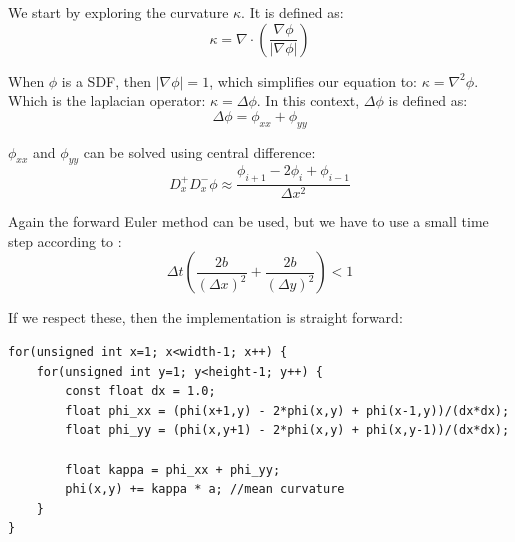 We start by exploring the curvature $\kappa$. It is defined as:
\begin{equation}
  \kappa = \nabla\cdot\left(\frac{\nabla\phi}{|\nabla\phi|}\right)
\end{equation}

When $\phi$ is a SDF, then $|\nabla\phi|=1$, which simplifies our equation
to: $\kappa = \nabla^2\phi$. Which is the laplacian operator: $\kappa =
\Delta\phi$. In this context, $\Delta\phi$ is defined as:
\begin{equation}
  \Delta\phi = \phi_{xx} + \phi_{yy}
\end{equation}

$\phi_{xx}$ and $\phi_{yy}$ can be solved using central difference:
\begin{equation}
  D^+_xD^-_x\phi 
  \approx
  \frac{\phi_{i+1}-2\phi_i+\phi_{i-1}}{\Delta x^2}
\end{equation} %

Again the forward Euler method can be used, but we have to use a small
time step according to :
\begin{equation}
   \Delta t \left(
     \frac{2b}{(\Delta x)^2} +
     \frac{2b}{(\Delta y)^2}
   \right) < 1
\end{equation}

If we respect these, then the  implementation is straight forward:


\begin{lstlisting}
for(unsigned int x=1; x<width-1; x++) {
    for(unsigned int y=1; y<height-1; y++) {
        const float dx = 1.0;
        float phi_xx = (phi(x+1,y) - 2*phi(x,y) + phi(x-1,y))/(dx*dx);
        float phi_yy = (phi(x,y+1) - 2*phi(x,y) + phi(x,y-1))/(dx*dx);

        float kappa = phi_xx + phi_yy;
        phi(x,y) += kappa * a; //mean curvature
    }
}
\end{lstlisting}

